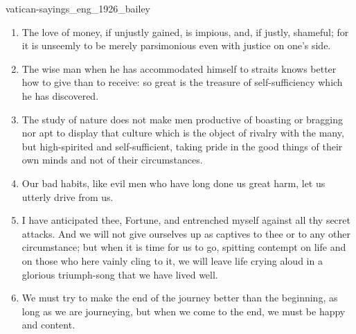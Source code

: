\documentclass{stex}
\begin{document}
\begin{smodule}{vatican-sayings_eng_1926_bailey}
\begin{sparagraph}[id=vatican-sayings,name={Vatican Sayings}]
\begin{enumerate}[listparindent=0cm]
    \item\begin{sparagraph}[id=saying:43,name=Vatican Saying 43]
      The love of money, if unjustly gained, is impious, and, if justly, shameful; for it is unseemly to be merely parsimonious even with justice on one's side.
    \end{sparagraph}

    \item\begin{sparagraph}[id=saying:44,name=Vatican Saying 44]
      The wise man when he has accommodated himself to straits knows better how to give than to receive: so great is the treasure of self-sufficiency which he has discovered.
    \end{sparagraph}

    \item\begin{sparagraph}[id=saying:45,name=Vatican Saying 45]
      The study of nature does not make men productive of boasting or bragging nor apt to display that culture which is the object of rivalry with the many, but high-spirited and self-sufficient, taking pride in the good things of their own minds and not of their circumstances.
    \end{sparagraph}

    \item\begin{sparagraph}[id=saying:46,name=Vatican Saying 46]
      Our bad habits, like evil men who have long done us great harm, let us utterly drive from us.
    \end{sparagraph}

    \item\begin{sparagraph}[id=saying:47,name=Vatican Saying 47]
      I have anticipated thee, Fortune, and entrenched myself against all thy secret attacks.
      And we will not give ourselves up as captives to thee or to any other circumstance; but when it is time for us to go, spitting contempt on life and on those who here vainly cling to it, we will leave life crying aloud in a glorious triumph-song that we have lived well.
    \end{sparagraph}

    \item\begin{sparagraph}[id=saying:48,name=Vatican Saying 48]
      We must try to make the end of the journey better than the beginning, as long as we are journeying, but when we come to the end, we must be happy and content.
    \end{sparagraph}


\end{enumerate}
\end{sparagraph}
\end{smodule}
\end{document}
